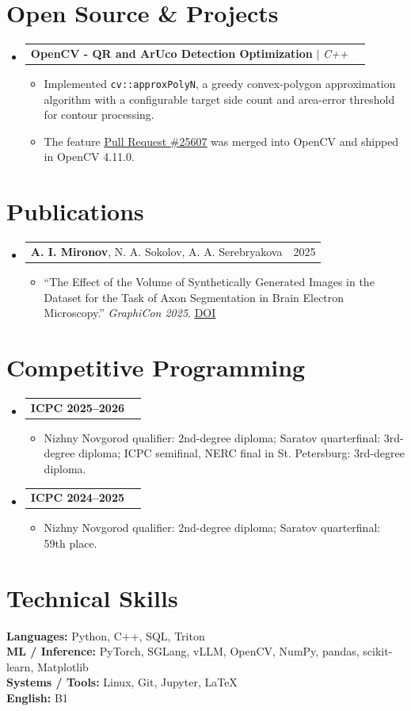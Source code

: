 \documentclass[letterpaper,10pt]{article}
\makeatletter
\newcommand{\resumeItem}[1]{\item\small{#1\vspace{-1pt}}}
\newcommand{\resumeProjectHeading}[2]{
  \item
  \begin{tabular*}{0.98\textwidth}{l@{\extracolsep{\fill}}r}
    \small #1 & \small #2 \\
  \end{tabular*}\vspace{-6pt}
}
\newcommand{\resumeSubHeadingListStart}{\begin{itemize}[leftmargin=0.14in,label={}]}
\newcommand{\resumeSubHeadingListEnd}{\end{itemize}}
\newcommand{\resumeItemListStart}{\begin{itemize}[leftmargin=0.22in,itemsep=1pt,topsep=2pt]}
\newcommand{\resumeItemListEnd}{\end{itemize}\vspace{-5pt}}
\makeatother
\begin{document}
\section{Open Source \& Projects}
\resumeSubHeadingListStart
  \resumeProjectHeading
    {\textbf{OpenCV - QR and ArUco Detection Optimization} $|$ \emph{C++}}{}
  \resumeItemListStart
    \resumeItem{Implemented \texttt{cv::approxPolyN}, a greedy convex-polygon approximation algorithm with a configurable target side count and area-error threshold for contour processing.}
    \resumeItem{The feature \href{https://github.com/opencv/opencv/pull/25607}{\underline{Pull Request \#25607}} was merged into OpenCV and shipped in OpenCV 4.11.0.}
  \resumeItemListEnd
\resumeSubHeadingListEnd


\section{Publications}
\resumeSubHeadingListStart
  \resumeProjectHeading
    {\textbf{A. I. Mironov}, N. A. Sokolov, A. A. Serebryakova}{2025}
  \resumeItemListStart
    \resumeItem{``The Effect of the Volume of Synthetically Generated Images in the Dataset for the Task of Axon Segmentation in Brain Electron Microscopy.'' \textit{GraphiCon 2025}. \href{https://doi.org/10.25686/978-5-8158-2474-4-2025-828-834}{\underline{DOI}}}
  \resumeItemListEnd
\resumeSubHeadingListEnd

\section{Competitive Programming}
\resumeSubHeadingListStart
  \resumeProjectHeading{\textbf{ICPC 2025--2026}}{}
  \resumeItemListStart
    \resumeItem{Nizhny Novgorod qualifier: 2nd-degree diploma; Saratov quarterfinal: 3rd-degree diploma; ICPC semifinal, NERC final in St. Petersburg: 3rd-degree diploma.}
  \resumeItemListEnd
  \resumeProjectHeading{\textbf{ICPC 2024--2025}}{}
  \resumeItemListStart
    \resumeItem{Nizhny Novgorod qualifier: 2nd-degree diploma; Saratov quarterfinal: 59th place.}
  \resumeItemListEnd
\resumeSubHeadingListEnd

\section{Technical Skills}
\begin{itemize}[leftmargin=0.14in,label={}]
  \small{\item{
    \textbf{Languages:} Python, C++, SQL, Triton \\
    \textbf{ML / Inference:} PyTorch, SGLang, vLLM, OpenCV, NumPy, pandas, scikit-learn, Matplotlib \\
    \textbf{Systems / Tools:} Linux, Git, Jupyter, LaTeX \\
    \textbf{English:} B1
  }}
\end{itemize}
\end{document}
